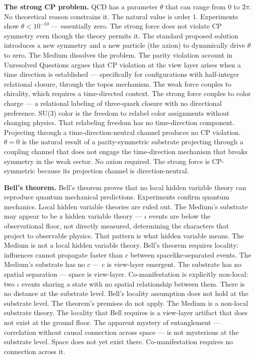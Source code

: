 \documentclass[11pt,letterpaper]{article}
\begin{document}
\textbf{The strong CP problem.} QCD has a parameter \(\theta\) that can range from 0 to \(2\pi\). No theoretical reason constrains it. The natural value is order 1. Experiments show \(\theta < 10^{-10}\) --- essentially zero. The strong force does not violate CP symmetry even though the theory permits it. The standard proposed solution introduces a new symmetry and a new particle (the axion) to dynamically drive \(\theta\) to zero. The Medium dissolves the problem. The parity violation account in Unresolved Questions argues that CP violation at the view layer arises when a time direction is established --- specifically for configurations with half-integer relational closure, through the topos mechanism. The weak force couples to chirality, which requires a time-directed context. The strong force couples to color charge --- a relational labeling of three-quark closure with no directional preference. SU(3) color is the freedom to relabel color assignments without changing physics. That relabeling freedom has no time-direction component. Projecting through a time-direction-neutral channel produces no CP violation. \(\theta = 0\) is the natural result of a parity-symmetric substrate projecting through a coupling channel that does not engage the time-direction mechanism that breaks symmetry in the weak sector. No axion required. The strong force is CP-symmetric because its projection channel is direction-neutral.

\textbf{Bell's theorem.} Bell's theorem proves that no local hidden variable theory can reproduce quantum mechanical predictions. Experiments confirm quantum mechanics. Local hidden variable theories are ruled out. The Medium's substrate may appear to be a hidden variable theory --- \(\iota\) events are below the observational floor, not directly measured, determining the characters that project to observable physics. That pattern is what hidden variable means. The Medium is not a local hidden variable theory. Bell's theorem requires locality: influences cannot propagate faster than \(c\) between spacelike-separated events. The Medium's substrate has no \(c\) --- \(c\) is view-layer emergent. The substrate has no spatial separation --- space is view-layer. Co-manifestation is explicitly non-local: two \(\iota\) events sharing a state with no spatial relationship between them. There is no distance at the substrate level. Bell's locality assumption does not hold at the substrate level. The theorem's premises do not apply. The Medium is a non-local substrate theory. The locality that Bell requires is a view-layer artifact that does not exist at the ground floor. The apparent mystery of entanglement --- correlation without causal connection across space --- is not mysterious at the substrate level. Space does not yet exist there. Co-manifestation requires no connection across it.
\end{document}

